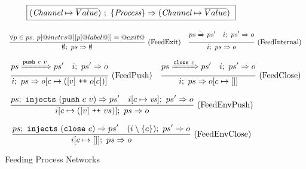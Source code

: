 
\begin{figure}

\newcommand\vs {\ti{vs}}
\newcommand\ps {\ti{ps}}

$$
  \boxed{
    (\textit{Channel} \mapsto \overline{Value})~;~\{ \textit{Process} \} \Rightarrow (\textit{Channel} \mapsto \overline{Value})~
  }
$$

$$
\enskip \frac {\displaystyle 
  \forall p \in ps.~
  p[@instrs@][p[@label@]] = @exit@
} {\displaystyle 
  \emptyset;~ps \Rightarrow \emptyset
} \  \mbox{(FeedExit)} \enskip
\enskip \frac {\displaystyle 
  ps \xRightarrow{\cdot} ps'
\quad
  i;~ps' \Rightarrow o
} {\displaystyle 
  i;~ps \Rightarrow o
} \  \mbox{(FeedInternal)} \enskip
$$

$$
\enskip \frac {\displaystyle 
  ps \xRightarrow{\texttt{push}~c~v} ps'
\quad
  i;~ps' \Rightarrow o
} {\displaystyle 
  i;~ps \Rightarrow o[c \mapsto ([v] ~\texttt{++}~ o[c])]
} \  \mbox{(FeedPush)} \enskip
\enskip \frac {\displaystyle 
  ps \xRightarrow{\texttt{close}~c} ps'
\quad
  i;~ps' \Rightarrow o
} {\displaystyle 
  i;~ps \Rightarrow o[c \mapsto []]
} \  \mbox{(FeedClose)} \enskip
$$





$$
\ruleIN{
  \ProcsInject
    {ps}
    {(\Push~c~v)}
    {ps'}
\quad
  \ProcsFeed
    {i[c \mapsto \vs]}
    {ps'}
    {o}
}{
  \ProcsFeed
    {i[c \mapsto ([v] \listappend vs)]}
    {ps}
    {o}
}{FeedEnvPush}
$$

$$
\enskip \frac {\displaystyle 
  ps;~\texttt{injects}~(\texttt{close}~c) \Rightarrow ps'
\quad
  (i\setminus\{ c \});~ps' \Rightarrow o
} {\displaystyle 
  i[c \mapsto [] ];~ps \Rightarrow o
} \  \mbox{(FeedEnvClose)} \enskip
$$



\caption{Feeding Process Networks}
\label{fig:Process:Eval:Feed}
\end{figure}

